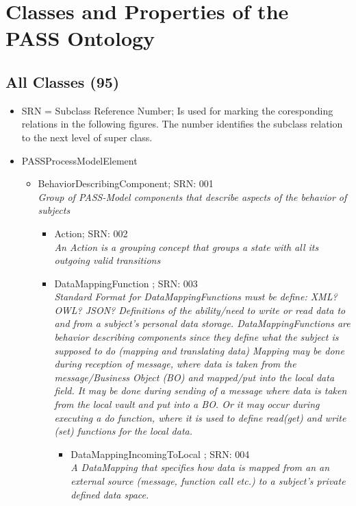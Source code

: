 \appendix

\chapter[Classes and Properties of the PASS Ontology]{Classes and Properties of the\\PASS Ontology}

\section{All Classes (95)}

\footnotesize

\begin{itemize}
\item SRN = Subclass Reference Number; Is used for marking the coresponding relations in the following figures. The number identifies the subclass relation to the next level of super class.
\item PASSProcessModelElement
\begin{itemize}
	\item BehaviorDescribingComponent; SRN: 001 \\  \textit{Group of PASS-Model components that describe aspects of the behavior of subjects}
	\begin{itemize}
		\item Action; SRN: 002 \\ \textit{An Action is a grouping concept that groups a state with all its outgoing valid transitions}
		\item DataMappingFunction ; SRN: 003 \\ \textit{Standard Format for DataMappingFunctions must be define: XML? OWL? JSON? 
		Definitions of the ability/need to write or read data to and from a subject's personal data storage.
		DataMappingFunctions are behavior describing components since they define what the subject is supposed to do (mapping and translating data)
		Mapping may be done during reception of message, where data is taken from the message/Business Object (BO) and mapped/put into the local data field.
		It may be done during sending of a message where data is taken from the local vault and put into a BO.
		Or it may occur during executing a do function, where it is used to define read(get) and write (set) functions for the local data.}
		\begin{itemize}
			\item DataMappingIncomingToLocal ; SRN: 004 \\ \textit{A DataMapping that specifies how data is mapped from an an external source (message, function call etc.) to a subject's private defined data space.}

\end{itemize}
\end{itemize}
\end{itemize}
\end{itemize}
